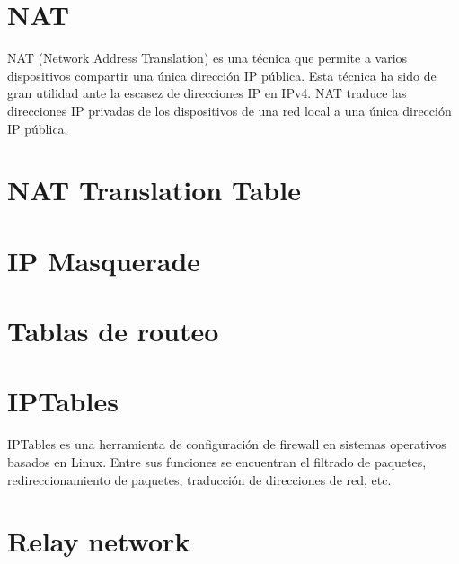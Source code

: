 \section{NAT} %
NAT (Network Address Translation) es una técnica que permite a varios dispositivos compartir una única dirección IP pública. 
Esta técnica ha sido de gran utilidad ante la escasez de direcciones IP en IPv4.
NAT traduce las direcciones IP privadas de los dispositivos de una red local a una única dirección IP pública.


\section{NAT Translation Table} %


\section{IP Masquerade} %



\section{Tablas de routeo}  


\section{IPTables} %
IPTables es una herramienta de configuración de firewall en sistemas operativos basados en Linux. Entre sus funciones se encuentran el filtrado de paquetes, redireccionamiento de paquetes, traducción de direcciones de red, etc.



\section{Relay network}%
